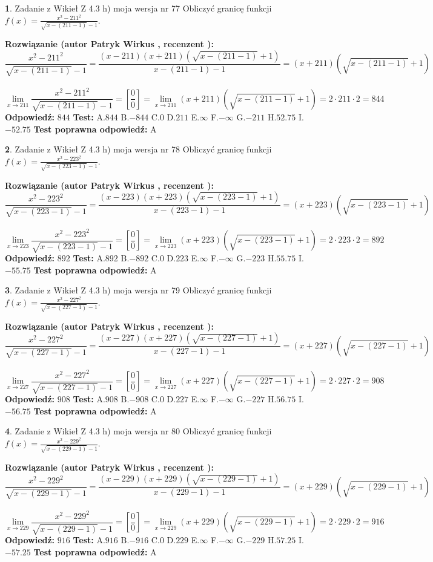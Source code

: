\documentclass[12pt, a4paper]{article}
\theoremstyle{definition} %
\newtheorem{zad}{}
\newcommand{\zadStart}[1]{\begin{zad}#1\newline}
\newcommand{\zadStop}{\end{zad}}
\newcommand{\rozwStart}[2]{\noindent \textbf{Rozwiązanie (autor #1 , recenzent #2): }\newline}
\newcommand{\rozwStop}{\newline}
\newcommand{\odpStart}{\noindent \textbf{Odpowiedź:}\newline}
\newcommand{\odpStop}{\newline}
\newcommand{\testStart}{\noindent \textbf{Test:}\newline}
\newcommand{\testStop}{\newline}
\newcommand{\kluczStart}{\noindent \textbf{Test poprawna odpowiedź:}\newline}
\newcommand{\kluczStop}{\newline}
\begin{document}
\zadStart{Zadanie z Wikieł Z 4.3 h) moja wersja nr 77}
Obliczyć granicę funkcji $f(x)=\frac{x^{2} - 211^{2}}{\sqrt{x-(211-1)}-1}$.
\zadStop
\rozwStart{Patryk Wirkus}{}
$$\frac{x^{2} - 211^{2}}{\sqrt{x-(211-1)}-1}=\frac{(x-211)(x+211)(\sqrt{x-(211-1)}+1)}{x-(211-1)-1}=(x+211)(\sqrt{x-(211-1)}+1)$$
\\
$$\lim\limits_{x\to 211}\frac{x^{2} - 211^{2}}{\sqrt{x-(211-1)}-1}=[\frac{0}{0}]=
\lim\limits_{x\to 211}(x+211)(\sqrt{x-(211-1)}+1) = 2\cdot211 \cdot 2 = 844$$
\rozwStop
\odpStart
$844$
\odpStop
\testStart
A.$844$
B.$-844$
C.$0$
D.$211$
E.$\infty$
F.$-\infty$
G.$-211$
H.$52.75$
I.$-52.75$
\testStop
\kluczStart
A
\kluczStop



\zadStart{Zadanie z Wikieł Z 4.3 h) moja wersja nr 78}
Obliczyć granicę funkcji $f(x)=\frac{x^{2} - 223^{2}}{\sqrt{x-(223-1)}-1}$.
\zadStop
\rozwStart{Patryk Wirkus}{}
$$\frac{x^{2} - 223^{2}}{\sqrt{x-(223-1)}-1}=\frac{(x-223)(x+223)(\sqrt{x-(223-1)}+1)}{x-(223-1)-1}=(x+223)(\sqrt{x-(223-1)}+1)$$
\\
$$\lim\limits_{x\to 223}\frac{x^{2} - 223^{2}}{\sqrt{x-(223-1)}-1}=[\frac{0}{0}]=
\lim\limits_{x\to 223}(x+223)(\sqrt{x-(223-1)}+1) = 2\cdot223 \cdot 2 = 892$$
\rozwStop
\odpStart
$892$
\odpStop
\testStart
A.$892$
B.$-892$
C.$0$
D.$223$
E.$\infty$
F.$-\infty$
G.$-223$
H.$55.75$
I.$-55.75$
\testStop
\kluczStart
A
\kluczStop



\zadStart{Zadanie z Wikieł Z 4.3 h) moja wersja nr 79}
Obliczyć granicę funkcji $f(x)=\frac{x^{2} - 227^{2}}{\sqrt{x-(227-1)}-1}$.
\zadStop
\rozwStart{Patryk Wirkus}{}
$$\frac{x^{2} - 227^{2}}{\sqrt{x-(227-1)}-1}=\frac{(x-227)(x+227)(\sqrt{x-(227-1)}+1)}{x-(227-1)-1}=(x+227)(\sqrt{x-(227-1)}+1)$$
\\
$$\lim\limits_{x\to 227}\frac{x^{2} - 227^{2}}{\sqrt{x-(227-1)}-1}=[\frac{0}{0}]=
\lim\limits_{x\to 227}(x+227)(\sqrt{x-(227-1)}+1) = 2\cdot227 \cdot 2 = 908$$
\rozwStop
\odpStart
$908$
\odpStop
\testStart
A.$908$
B.$-908$
C.$0$
D.$227$
E.$\infty$
F.$-\infty$
G.$-227$
H.$56.75$
I.$-56.75$
\testStop
\kluczStart
A
\kluczStop



\zadStart{Zadanie z Wikieł Z 4.3 h) moja wersja nr 80}
Obliczyć granicę funkcji $f(x)=\frac{x^{2} - 229^{2}}{\sqrt{x-(229-1)}-1}$.
\zadStop
\rozwStart{Patryk Wirkus}{}
$$\frac{x^{2} - 229^{2}}{\sqrt{x-(229-1)}-1}=\frac{(x-229)(x+229)(\sqrt{x-(229-1)}+1)}{x-(229-1)-1}=(x+229)(\sqrt{x-(229-1)}+1)$$
\\
$$\lim\limits_{x\to 229}\frac{x^{2} - 229^{2}}{\sqrt{x-(229-1)}-1}=[\frac{0}{0}]=
\lim\limits_{x\to 229}(x+229)(\sqrt{x-(229-1)}+1) = 2\cdot229 \cdot 2 = 916$$
\rozwStop
\odpStart
$916$
\odpStop
\testStart
A.$916$
B.$-916$
C.$0$
D.$229$
E.$\infty$
F.$-\infty$
G.$-229$
H.$57.25$
I.$-57.25$
\testStop
\kluczStart
A
\kluczStop
\end{document}
